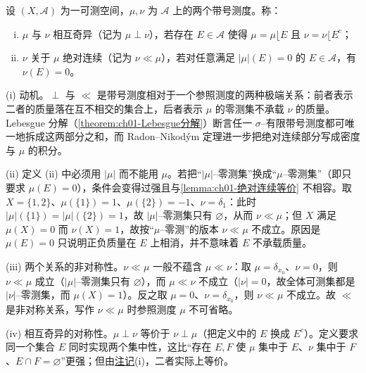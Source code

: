 \documentclass[../../main.tex]{subfiles}%
\begin{document}
\begin{definition}\label{definition:ch01-相互奇异绝对连续}\label{definition:ch01-测度绝对连续}
设 $(X,\mathcal{A})$ 为一可测空间，$\mu,\nu$ 为 $\mathcal{A}$ 上的两个带号测度。称：
\begin{enumerate}[(i)]
\item $\mu$ 与 $\nu$ 相互奇异（记为 $\mu\perp\nu$），若存在 $E\in\mathcal{A}$ 使得 $\mu=\mu\lfloor E$ 且 $\nu=\nu\lfloor E^c$；
\item $\nu$ 关于 $\mu$ 绝对连续（记为 $\nu\ll\mu$），若对任意满足 $|\mu|(E)=0$ 的 $E\in\mathcal{A}$，有 $\nu(E)=0$。
\end{enumerate}
\end{definition}

\begin{remark}\label{remark:ch01-奇异绝对连续动机}
(i) 动机。$\perp$ 与 $\ll$ 是带号测度相对于一个参照测度的两种极端关系：前者表示二者的质量落在互不相交的集合上，后者表示 $\mu$ 的零测集不承载 $\nu$ 的质量。Lebesgue 分解（\cref{theorem:ch01-Lebesgue分解}）断言任一 $\sigma$--有限带号测度都可唯一地拆成这两部分之和，而 Radon--Nikodým 定理进一步把绝对连续部分写成密度与 $\mu$ 的积分。

(ii) 定义 (ii) 中必须用 $|\mu|$ 而不能用 $\mu$。若把“$|\mu|$--零测集”换成“$\mu$--零测集”（即只要求 $\mu(E)=0$），条件会变得过强且与\cref{lemma:ch01-绝对连续等价} 不相容。取 $X=\{1,2\}$、$\mu(\{1\})=1$、$\mu(\{2\})=-1$、$\nu=\delta_1$：此时 $|\mu|(\{1\})=|\mu|(\{2\})=1$，故 $|\mu|$--零测集只有 $\varnothing$，从而 $\nu\ll\mu$；但 $X$ 满足 $\mu(X)=0$ 而 $\nu(X)=1$，故按“$\mu$--零测”的版本 $\nu\ll\mu$ 不成立。原因是 $\mu(E)=0$ 只说明正负质量在 $E$ 上相消，并不意味着 $E$ 不承载质量。

(iii) 两个关系的非对称性。$\nu\ll\mu$ 一般不蕴含 $\mu\ll\nu$：取 $\mu=\delta_{x_0}$、$\nu=0$，则 $\nu\ll\mu$ 成立（$|\mu|$--零测集只有 $\varnothing$），而 $\mu\ll\nu$ 不成立（$|\nu|=0$，故全体可测集都是 $|\nu|$--零测集，而 $\mu(X)=1$）。反之取 $\mu=0$、$\nu=\delta_{x_0}$，则 $\nu\ll\mu$ 不成立。故 $\ll$ 是非对称关系，写作 $\nu\ll\mu$ 时参照测度 $\mu$ 不可省略。

(iv) 相互奇异的对称性。$\mu\perp\nu$ 等价于 $\nu\perp\mu$（把定义中的 $E$ 换成 $E^c$）。定义要求同一个集合 $E$ 同时实现两个集中性，这比“存在 $E,F$ 使 $\mu$ 集中于 $E$、$\nu$ 集中于 $F$、$E\cap F=\varnothing$”更强；但由\hyperref[remark:ch01-奇异绝对连续注记]{注记}(i)，二者实际上等价。
\end{remark}
\end{document}
